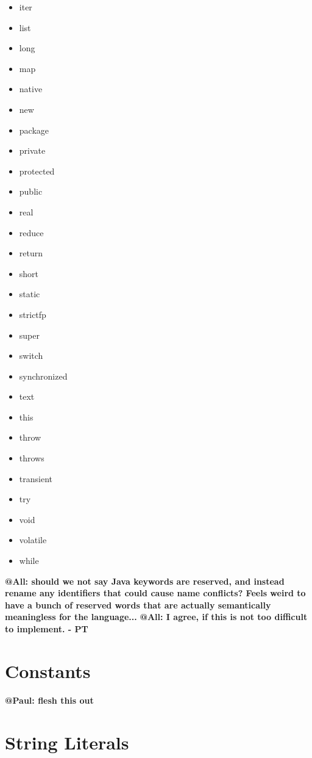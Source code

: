\documentclass{book}
\begin{document}
\begin{multicols}{4}
\begin{itemize}
  \item[] iter
  \item[] list
  \item[] long
  \item[] map
  \item[] native
  \item[] new
  \item[] package
  \item[] private
  \item[] protected
  \item[] public
  \item[] real
  \item[] reduce
  \item[] return
  \item[] short
  \item[] static
  \item[] strictfp
  \item[] super
  \item[] switch
  \item[] synchronized
  \item[] text
  \item[] this
  \item[] throw
  \item[] throws
  \item[] transient
  \item[] try
  \item[] void
  \item[] volatile
  \item[] while
\end{itemize}
\rm
\end{multicols}

\textbf{@All: should we not say Java keywords are reserved, and instead rename any
identifiers that could cause name conflicts? Feels weird to have a bunch of
reserved words that are actually semantically meaningless for the language...}
\textbf{@All: I agree, if this is not too difficult to implement. - PT}

\section{Constants} %
\label{sec:constants}

\textbf{@Paul: flesh this out}


\section{String Literals} %
\label{sec:string_literals}
\end{document}
